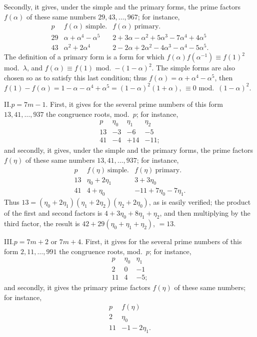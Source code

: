 \documentclass[11pt,a4paper]{article}
\begin{document}
Secondly, it gives, under the simple and the primary forms, the prime factors $f(\alpha)$ of these same numbers $29, 43, \ldots, 967$; for instance,
\[
\begin{array}{c|l|l}
p & f(\alpha)\ \text{simple.} & f(\alpha)\ \text{primary.} \\
\hline
29 & \alpha + \alpha^{4} - \alpha^{5} & 2 + 3\alpha - \alpha^{2} + 5\alpha^{3} - 7\alpha^{4} + 4\alpha^{5} \\
43 & \alpha^{2} + 2\alpha^{4} & 2 - 2\alpha + 2\alpha^{2} - 4\alpha^{3} - \alpha^{4} - 5\alpha^{5}.
\end{array}
\]
The definition of a primary form is a form for which $f(\alpha)f(\alpha^{-1}) \equiv f(1)^{2}$ mod.~$\lambda$, and $f(\alpha) \equiv f(1)$ mod.~$-(1 - \alpha)^{2}$. The simple forms are also chosen so as to satisfy this last condition; thus $f(\alpha) = \alpha + \alpha^{4} - \alpha^{5}$, then $f(1) - f(\alpha) = 1 - \alpha - \alpha^{4} + \alpha^{5} = (1 - \alpha)^{2}(1 + \alpha)$, $\equiv 0$ mod.~$(1 - \alpha)^{2}$.

II.\quad $p = 7m - 1$. First, it gives for the several prime numbers of this form $13, 41, \ldots, 937$ the congruence roots, mod.~$p$; for instance,
\[
\begin{array}{c|ccc}
p & \eta_{0} & \eta_{1} & \eta_{2} \\
\hline
13 & -3 & -6 & -5 \\
41 & -4 & +14 & -11;
\end{array}
\]
and secondly, it gives, under the simple and the primary forms, the prime factors $f(\eta)$ of these same numbers $13, 41, \ldots, 937$; for instance,
\[
\begin{array}{c|l|l}
p & f(\eta)\ \text{simple.} & f(\eta)\ \text{primary.} \\
\hline
13 & \eta_{0} + 2\eta_{1} & 3 + 3\eta_{0} \\
41 & 4 + \eta_{0} & -11 + 7\eta_{0} - 7\eta_{1}.
\end{array}
\]
Thus $13 = (\eta_{0} + 2\eta_{1})(\eta_{1} + 2\eta_{2})(\eta_{2} + 2\eta_{0})$, as is easily verified; the product of the first and second factors is $4 + 3\eta_{0} + 8\eta_{1} + \eta_{2}$, and then multiplying by the third factor, the result is $42 + 29(\eta_{0} + \eta_{1} + \eta_{2})$, $= 13$.

III.\quad $p = 7m + 2$ or $7m + 4$. First, it gives for the several prime numbers of this form $2, 11, \ldots, 991$ the congruence roots, mod.~$p$; for instance,
\[
\begin{array}{c|cc}
p & \eta_{0} & \eta_{1} \\
\hline
2 & 0 & -1 \\
11 & 4 & -5;
\end{array}
\]
and secondly, it gives the primary prime factors $f(\eta)$ of these same numbers; for instance,
\[
\begin{array}{c|l}
p & f(\eta) \\
\hline
2 & \eta_{0} \\
11 & -1 - 2\eta_{1}.
\end{array}
\]
\end{document}
